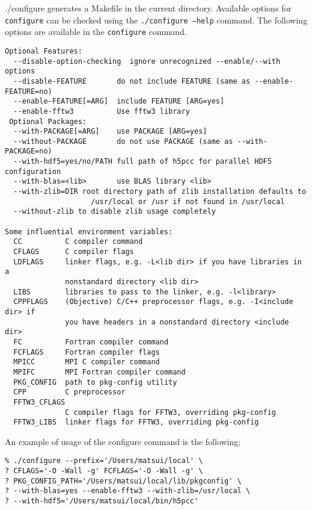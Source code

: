 {./configure} generates a Makefile in the current directory.  Available options for {\tt configure} can be checked using the {\tt ./configure --help} command. The following options are available in the {\tt configure} command.
%
{\small
\begin{verbatim}
Optional Features:
  --disable-option-checking  ignore unrecognized --enable/--with options
  --disable-FEATURE       do not include FEATURE (same as --enable-FEATURE=no)
  --enable-FEATURE[=ARG]  include FEATURE [ARG=yes]
  --enable-fftw3          Use fftw3 library 
 Optional Packages:
  --with-PACKAGE[=ARG]    use PACKAGE [ARG=yes]
  --without-PACKAGE       do not use PACKAGE (same as --with-PACKAGE=no)
  --with-hdf5=yes/no/PATH full path of h5pcc for parallel HDF5 configuration
  --with-blas=<lib>       use BLAS library <lib>
  --with-zlib=DIR root directory path of zlib installation defaults to
                    /usr/local or /usr if not found in /usr/local
  --without-zlib to disable zlib usage completely

Some influential environment variables:
  CC          C compiler command
  CFLAGS      C compiler flags
  LDFLAGS     linker flags, e.g. -L<lib dir> if you have libraries in a
              nonstandard directory <lib dir>
  LIBS        libraries to pass to the linker, e.g. -l<library>
  CPPFLAGS    (Objective) C/C++ preprocessor flags, e.g. -I<include dir> if
              you have headers in a nonstandard directory <include dir>
  FC          Fortran compiler command
  FCFLAGS     Fortran compiler flags
  MPICC       MPI C compiler command
  MPIFC       MPI Fortran compiler command
  PKG_CONFIG  path to pkg-config utility
  CPP         C preprocessor
  FFTW3_CFLAGS
              C compiler flags for FFTW3, overriding pkg-config
  FFTW3_LIBS  linker flags for FFTW3, overriding pkg-config

\end{verbatim}
}
%
An example of usage of the configure command is the following;
\begin{verbatim}
% ./configure --prefix='/Users/matsui/local' \
? CFLAGS='-O -Wall -g' FCFLAGS='-O -Wall -g' \
? PKG_CONFIG_PATH='/Users/matsui/local/lib/pkgconfig' \
? --with-blas=yes --enable-fftw3 --with-zlib=/usr/local \
? --with-hdf5='/Users/matsui/local/bin/h5pcc'

\end{verbatim}

